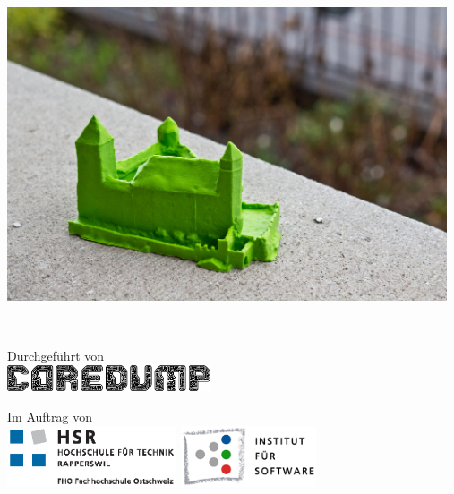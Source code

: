 
\begin{titlepage}

\begin{addmargin}[-1cm]{-3cm}
\begin{center}
\large

\hfill
\vfill

\begingroup
\color{Maroon}{\LARGE\spacedallcaps{\myTitle}}\\ \bigskip %
\endgroup

\spacedlowsmallcaps{\myName} \\
\spacedlowsmallcaps{\myHackerspace}

\vfill

\includegraphics[width=13cm]{images/schloss} \\ \bigskip %

\mySubtitle \\ %

\vspace{2cm}

Durchgeführt von \\
\vspace{4mm}
\includegraphics[width=6cm]{images/coredump-logo}

\vspace{10mm}

Im Auftrag von \\
\vspace{1mm}
\includegraphics[width=5cm]{images/HSR_Logo_CMYK}
\quad\quad
\includegraphics[width=4cm]{images/ifs-logo}


\end{center}
\end{addmargin}

\end{titlepage}
